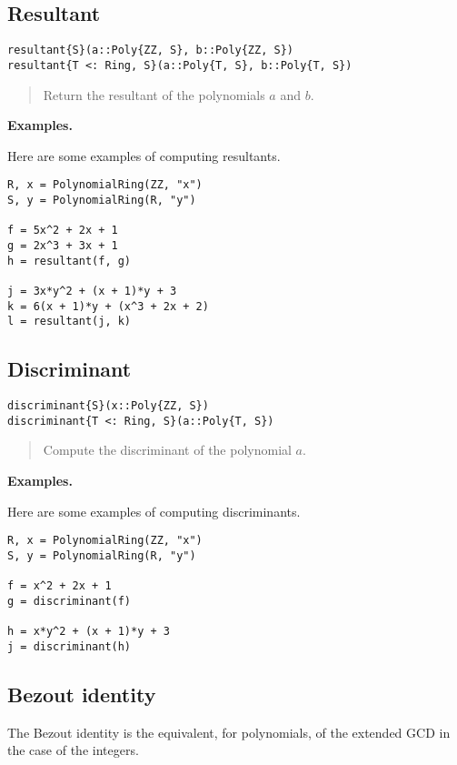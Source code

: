 \documentclass[a4paper,10pt]{article}
\newcommand{\desc}[1]{\vspace{-3mm}\begin{quote}#1\end{quote}}
\begin{document}
{{{{{{\subsection{Resultant}

\begin{lstlisting}
resultant{S}(a::Poly{ZZ, S}, b::Poly{ZZ, S})
resultant{T <: Ring, S}(a::Poly{T, S}, b::Poly{T, S})
\end{lstlisting}

\desc{Return the resultant of the polynomials $a$ and $b$.}

\textbf{Examples.}

Here are some examples of computing resultants.

\begin{lstlisting}
R, x = PolynomialRing(ZZ, "x")
S, y = PolynomialRing(R, "y")

f = 5x^2 + 2x + 1
g = 2x^3 + 3x + 1
h = resultant(f, g)

j = 3x*y^2 + (x + 1)*y + 3
k = 6(x + 1)*y + (x^3 + 2x + 2)
l = resultant(j, k)
\end{lstlisting}

\subsection{Discriminant}

\begin{lstlisting}
discriminant{S}(x::Poly{ZZ, S})
discriminant{T <: Ring, S}(a::Poly{T, S})
\end{lstlisting}

\desc{Compute the discriminant of the polynomial $a$.}

\textbf{Examples.}

Here are some examples of computing discriminants.

\begin{lstlisting}
R, x = PolynomialRing(ZZ, "x")
S, y = PolynomialRing(R, "y")

f = x^2 + 2x + 1
g = discriminant(f)

h = x*y^2 + (x + 1)*y + 3
j = discriminant(h)
\end{lstlisting}

\subsection{Bezout identity}

The Bezout identity is the equivalent, for polynomials, of the extended GCD
in the case of the integers.

}}}}}}
\end{document}
